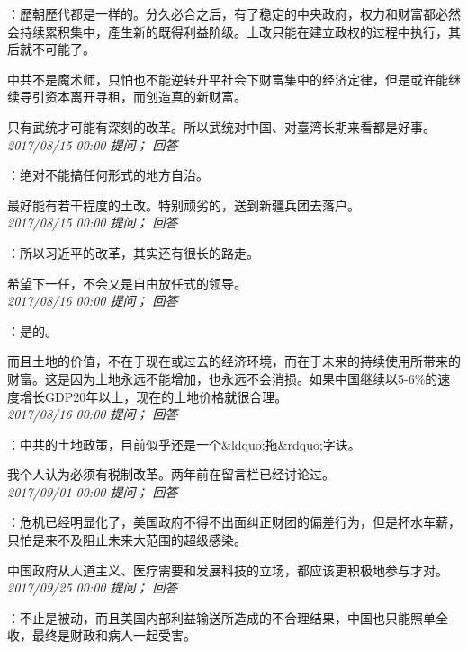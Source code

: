 \documentclass[twocolumn]{ctexart}
\begin{document}
：歷朝歷代都是一样的。分久必合之后，有了稳定的中央政府，权力和财富都必然会持续累积集中，產生新的既得利益阶级。土改只能在建立政权的过程中执行，其后就不可能了。

中共不是魔术师，只怕也不能逆转升平社会下财富集中的经济定律，但是或许能继续导引资本离开寻租，而创造真的新财富。

只有武统才可能有深刻的改革。所以武统对中国、对臺湾长期来看都是好事。\\

\textit{\hfill\noindent\small 2017/08/15 00:00 提问； 回答}

：绝对不能搞任何形式的地方自治。

最好能有若干程度的土改。特别顽劣的，送到新疆兵团去落户。\\

\textit{\hfill\noindent\small 2017/08/15 00:00 提问； 回答}

：所以习近平的改革，其实还有很长的路走。

希望下一任，不会又是自由放任式的领导。\\

\textit{\hfill\noindent\small 2017/08/16 00:00 提问； 回答}

：是的。

而且土地的价值，不在于现在或过去的经济环境，而在于未来的持续使用所带来的财富。这是因为土地永远不能增加，也永远不会消损。如果中国继续以5-6\%的速度增长GDP20年以上，现在的土地价格就很合理。\\

\textit{\hfill\noindent\small 2017/08/16 00:00 提问； 回答}

：中共的土地政策，目前似乎还是一个\&ldquo;拖\&rdquo;字诀。

我个人认为必须有税制改革。两年前在留言栏已经讨论过。\\

\textit{\hfill\noindent\small 2017/09/01 00:00 提问； 回答}

：危机已经明显化了，美国政府不得不出面纠正财团的偏差行为，但是杯水车薪，只怕是来不及阻止未来大范围的超级感染。

中国政府从人道主义、医疗需要和发展科技的立场，都应该更积极地参与才对。\\

\textit{\hfill\noindent\small 2017/09/25 00:00 提问； 回答}

：不止是被动，而且美国内部利益输送所造成的不合理结果，中国也只能照单全收，最终是财政和病人一起受害。
\end{document}
